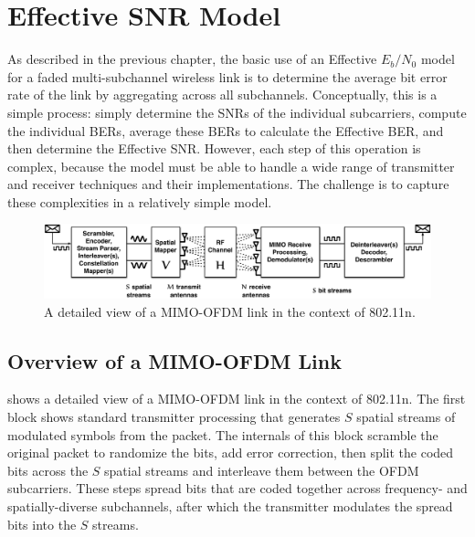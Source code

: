 \ifx\mainfile\undefined

\setcounter{chapter}{3} %
\fi

\cleardoublepage
\chapter{Effective SNR Model}
\label{chap:model}

As described in the previous chapter, the basic use of an Effective $E_b/N_0$ model for a faded multi-subchannel wireless link is to determine the average bit error rate of the link by aggregating across all subchannels. Conceptually, this is a simple process: simply determine the SNRs of the individual subcarriers, compute the individual BERs, average these BERs to calculate the Effective BER, and then determine the Effective SNR. However, each step of this operation is complex, because the model must be able to handle a wide range of transmitter and receiver techniques and their implementations. The challenge is to capture these complexities in a relatively simple model.

\begin{figure}[ht]
\centering
\includegraphics[width=\textwidth]{figures/11n_link_simplified_bigger_fonts.pdf}
\caption[An 802.11n link]{\label{fig:11n_link_simplified}A detailed view of a MIMO-OFDM link in the context of 802.11n.}
\end{figure}

\section{Overview of a MIMO-OFDM Link}
 shows a detailed view of a MIMO-OFDM link in the context of 802.11n. The first block shows standard transmitter processing that generates $S$ spatial streams of modulated symbols from the packet. The internals of this block scramble the original packet to randomize the bits, add error correction, then split the coded bits across the $S$ spatial streams and interleave them between the OFDM subcarriers. These steps spread bits that are coded together across frequency- and spatially-diverse subchannels, after which the transmitter modulates the spread bits into the $S$ streams.

